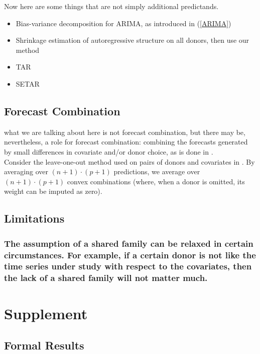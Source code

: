 \documentclass{uiucthesis2021}
\theoremstyle{definition}
\begin{document}
  Now here are some things that are not simply additional predictands.
    \begin{itemize}
    \item Bias-variance decomposition for ARIMA, as introduced in (\ref{ARIMA})
    \item Shrinkage estimation of autoregressive structure on all donors, then use our method
    \item TAR
    \item SETAR

  \end{itemize}
  
  \subsection{Forecast Combination}
  what we are talking about here is not forecast combination, but there may be, nevertheless, a role for forecast combination: combining the forecasts generated by small differences in covariate and/or donor choice, as is done in \cite[][]{lundquist2024volatility}. \\
  
  Consider the leave-one-out method used on pairs of donors and covariates in \cite[][]{lundquist2024volatility}.  By averaging over $(n+1)\cdot (p+1)$ predictions, we average over $(n+1) \cdot (p + 1)$ convex combinations (where, when a donor is omitted, its weight can be imputed as zero).
  
  \subsection{Limitations}\label{Limitations}
    
  \subsubsection{The assumption of a shared family can be relaxed in certain circumstances.  For example, if a certain donor is not like the time series under study with respect to the covariates, then the lack of a shared family will not matter much.}
  
  \section{Supplement}
  
  \subsection{Formal Results}
  
\end{document}
